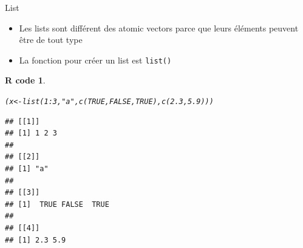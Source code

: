 \documentclass[11pt]{beamer}\usepackage[]{graphicx}\usepackage[]{color}
\makeatletter
\newcommand{\hlnum}[1]{\textcolor[rgb]{0.063,0.58,0.627}{#1}}%
\newcommand{\hlstr}[1]{\textcolor[rgb]{0.063,0.58,0.627}{#1}}%
\newcommand{\hlopt}[1]{\textcolor[rgb]{0.196,0.196,0.196}{#1}}%
\newcommand{\hlstd}[1]{\textcolor[rgb]{0.196,0.196,0.196}{#1}}%
\newcommand{\hlkwb}[1]{\textcolor[rgb]{0.627,0,0.314}{#1}}%
\newcommand{\hlkwd}[1]{\textcolor[rgb]{0.78,0.227,0.412}{#1}}%
\newenvironment{kframe}{%
 \def\at@end@of@kframe{}%
 \ifinner\ifhmode%
  \def\at@end@of@kframe{\end{minipage}}%
  \begin{minipage}{\columnwidth}%
 \fi\fi%
 \def\FrameCommand##1{\hskip\@totalleftmargin \hskip-\fboxsep
 \colorbox{shadecolor}{##1}\hskip-\fboxsep
     \hskip-\linewidth \hskip-\@totalleftmargin \hskip\columnwidth}%
 \MakeFramed {\advance\hsize-\width
   \@totalleftmargin\z@ \linewidth\hsize
   \@setminipage}}%
 {\par\unskip\endMakeFramed%
 \at@end@of@kframe}
\newenvironment{knitrout}{}{} %
\newtheorem{rcode}{R code}[section]
\newcommand{\code}[1]{\texttt{#1}}
\makeatother
\begin{document}
\begin{frame}[fragile]{List}

\begin{itemize}
\item Les lists sont différent des atomic vectors parce que leurs éléments peuvent \^{e}tre de tout type
\item La fonction pour créer un list est \code{list()}
\end{itemize}
\pause
\begin{knitrout}\footnotesize
{}\color{fgcolor}\begin{kframe}
\begin{rcode}\label{unnamed-chunk-18}\begin{alltt}
\hlstd{(x} \hlkwb{<-} \hlkwd{list}\hlstd{(}\hlnum{1}\hlopt{:}\hlnum{3}\hlstd{,} \hlstr{"a"}\hlstd{,} \hlkwd{c}\hlstd{(}\hlnum{TRUE}\hlstd{,} \hlnum{FALSE}\hlstd{,} \hlnum{TRUE}\hlstd{),} \hlkwd{c}\hlstd{(}\hlnum{2.3}\hlstd{,} \hlnum{5.9}\hlstd{)))}
\end{alltt}
\begin{verbatim}
## [[1]]
## [1] 1 2 3
## 
## [[2]]
## [1] "a"
## 
## [[3]]
## [1]  TRUE FALSE  TRUE
## 
## [[4]]
## [1] 2.3 5.9
\end{verbatim}
\end{rcode}\end{kframe}
\end{knitrout}

\end{frame}

\end{document}
